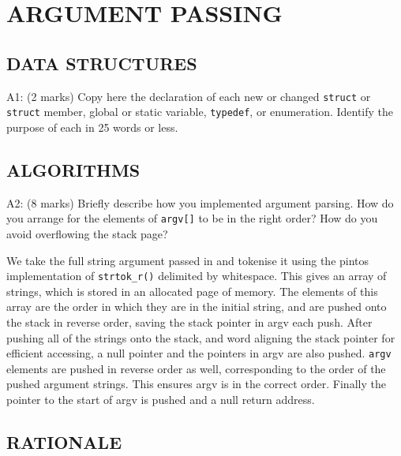 \section{ARGUMENT PASSING}

\subsection*{DATA STRUCTURES}

\noindent A1: (2 marks)
Copy here the declaration of each new or changed \texttt{struct} or \texttt{struct} member, global or static variable, \texttt{typedef}, or enumeration.  Identify the purpose of each in 25 words or less.




\subsection*{ALGORITHMS}

\noindent A2: (8 marks)
Briefly describe how you implemented argument parsing.  How do
you arrange for the elements of \texttt{argv[]} to be in the right order?
How do you avoid overflowing the stack page?


We take the full string argument passed in and tokenise it using the pintos implementation of \texttt{strtok\_r()} delimited by whitespace. This gives an array of strings, which is stored in an allocated page of memory. The elements of this array are the order in which they are in the initial string, and are pushed onto the stack in reverse order, saving the stack pointer in argv each push. After pushing all of the strings onto the stack, and word aligning the stack pointer for efficient accessing, a null pointer and the pointers in argv are also pushed. \texttt{argv} elements are pushed in reverse order as well, corresponding to the order of the pushed argument strings. This ensures argv is in the correct order. Finally the pointer to the start of argv is pushed and a null return address.



\subsection*{RATIONALE}

